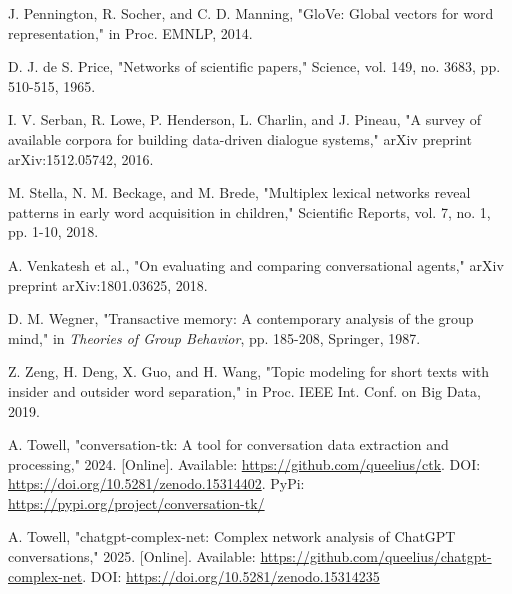 \documentclass[10pt, a4paper]{article}
\begin{document}
\begin{thebibliography}{00}
 J. Pennington, R. Socher, and C. D. Manning, "GloVe: Global vectors for word representation," in Proc. EMNLP, 2014.

 D. J. de S. Price, "Networks of scientific papers," Science, vol. 149, no. 3683, pp. 510-515, 1965.

 I. V. Serban, R. Lowe, P. Henderson, L. Charlin, and J. Pineau, "A survey of available corpora for building data-driven dialogue systems," arXiv preprint arXiv:1512.05742, 2016.

 M. Stella, N. M. Beckage, and M. Brede, "Multiplex lexical networks reveal patterns in early word acquisition in children," Scientific Reports, vol. 7, no. 1, pp. 1-10, 2018.

 A. Venkatesh et al., "On evaluating and comparing conversational agents," arXiv preprint arXiv:1801.03625, 2018.

 D. M. Wegner, "Transactive memory: A contemporary analysis of the group mind," in \emph{Theories of Group Behavior}, pp. 185-208, Springer, 1987.

 Z. Zeng, H. Deng, X. Guo, and H. Wang, "Topic modeling for short texts with insider and outsider word separation," in Proc. IEEE Int. Conf. on Big Data, 2019.

 A. Towell, "conversation-tk: A tool for conversation data extraction and processing," 2024. [Online]. Available: \url{https://github.com/queelius/ctk}. DOI: \url{https://doi.org/10.5281/zenodo.15314402}. PyPi: \url{https://pypi.org/project/conversation-tk/}

 A. Towell, "chatgpt-complex-net: Complex network analysis of ChatGPT conversations," 2025. [Online]. Available: \url{https://github.com/queelius/chatgpt-complex-net}. DOI: \url{https://doi.org/10.5281/zenodo.15314235}

\end{thebibliography}
\end{document}
